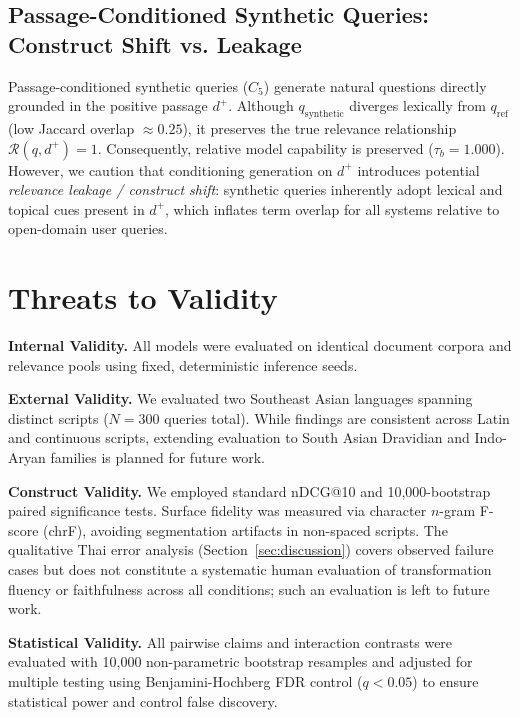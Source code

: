 \documentclass[runningheads]{llncs}
\begin{document}
\subsection{Passage-Conditioned Synthetic Queries: Construct Shift vs. Leakage}
Passage-conditioned synthetic queries ($C_5$) generate natural questions directly grounded in the positive passage $d^+$. Although $q_{\text{synthetic}}$ diverges lexically from $q_{\text{ref}}$ (low Jaccard overlap $\approx 0.25$), it preserves the true relevance relationship $\mathcal{R}(q, d^+) = 1$. Consequently, relative model capability is preserved ($\tau_b = 1.000$). However, we caution that conditioning generation on $d^+$ introduces potential \textit{relevance leakage / construct shift}: synthetic queries inherently adopt lexical and topical cues present in $d^+$, which inflates term overlap for all systems relative to open-domain user queries.

\section{Threats to Validity}
\label{sec:threats}
\noindent\textbf{Internal Validity.} All models were evaluated on identical document corpora and relevance pools using fixed, deterministic inference seeds.

\noindent\textbf{External Validity.} We evaluated two Southeast Asian languages spanning distinct scripts ($N = 300$ queries total). While findings are consistent across Latin and continuous scripts, extending evaluation to South Asian Dravidian and Indo-Aryan families is planned for future work.

\noindent\textbf{Construct Validity.} We employed standard nDCG@10 and 10,000-bootstrap paired significance tests. Surface fidelity was measured via character $n$-gram F-score (chrF), avoiding segmentation artifacts in non-spaced scripts. The qualitative Thai error analysis (Section~\ref{sec:discussion}) covers observed failure cases but does not constitute a systematic human evaluation of transformation fluency or faithfulness across all conditions; such an evaluation is left to future work.

\noindent\textbf{Statistical Validity.} All pairwise claims and interaction contrasts were evaluated with 10,000 non-parametric bootstrap resamples and adjusted for multiple testing using Benjamini-Hochberg FDR control ($q < 0.05$) to ensure statistical power and control false discovery.
\end{document}
